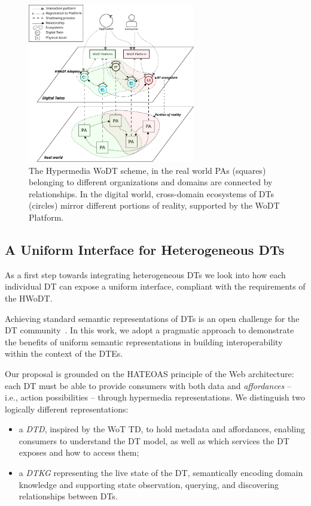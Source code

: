 \begin{figure}[ht]
  \centering
  \includegraphics[width=0.65\textwidth]{figures/hwodt/hwodt.pdf}
  \caption{The Hypermedia WoDT scheme, in the real world PAs (squares) belonging to different organizations and domains are connected by relationships. In the digital world, cross-domain ecosystems of DTs (circles) mirror different portions of reality, supported by the WoDT Platform.}
  \label{fig:hwodt}
\end{figure}


\subsection{A Uniform Interface for Heterogeneous \aclp{DT}}\label{ssec:uniform-interface}

As a first step towards integrating heterogeneous \acp{DT} we look into how each individual \ac{DT} can expose a uniform interface, compliant with the requirements of the \ac{HWoDT}.

Achieving standard semantic representations of \acp{DT} is an open challenge for the \ac{DT} community~\cite{burattini2024models}.
In this work, we adopt a pragmatic approach to demonstrate the benefits of uniform semantic representations in building interoperability within the context of the \acp{DTE}.

Our proposal is grounded on the \ac{HATEOAS} principle of the Web architecture:
each \ac{DT} must be able to provide consumers with both data and \emph{affordances} -- i.e., action possibilities -- through hypermedia representations.
We distinguish two logically different representations:
\begin{itemize}
    \item a \emph{\acf{DTD}}, inspired by the \ac{WoT} \acl{TD}, to hold metadata and affordances, enabling consumers to understand the \ac{DT} model, as well as which services the \ac{DT} exposes and how to access them;
    \item a \emph{\acf{DTKG}} representing the live state of the \ac{DT}, semantically encoding domain knowledge and supporting state observation, querying, and discovering relationships between \acp{DT}.
\end{itemize}

